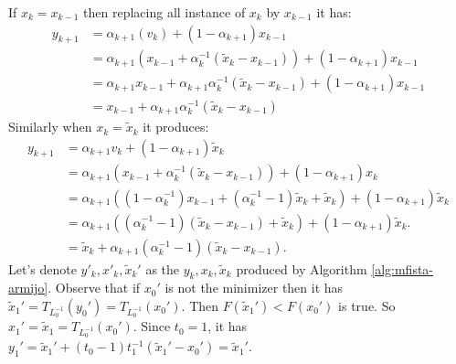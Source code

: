 \documentclass[12pt]{report}
\begin{document}
\begin{example}
            If $x_k = x_{k - 1}$ then replacing all instance of $x_k$ by $x_{k - 1}$ it has: 
            \begin{align*}
                y_{k + 1} &= \alpha_{k + 1}(v_k) + (1 - \alpha_{k + 1})x_{k - 1}
                \\
                &= \alpha_{k + 1}(x_{k - 1} + \alpha_k^{-1}(\tilde x_k - x_{k - 1})) + (1 - \alpha_{k + 1})x_{k - 1}
                \\
                &= \alpha_{k + 1} x_{k - 1} + \alpha_{k + 1}\alpha_k^{-1}(\tilde x_k - x_{k - 1}) + (1 - \alpha_{k + 1}) x_{k - 1}
                \\
                &= x_{k - 1} + \alpha_{k + 1}\alpha_k^{-1}(\tilde x_k - x_{k - 1})
            \end{align*}
            Similarly when $x_k = \tilde x_k$ it produces: 
            \begin{align*}
                y_{k + 1} &= 
                \alpha_{k + 1}v_k + (1 - \alpha_{k + 1})\tilde x_k
                \\
                &= 
                \alpha_{k + 1}(x_{k - 1} + \alpha_k^{-1}(\tilde x_k - x_{k - 1})) + (1 - \alpha_{k + 1})x_k
                \\
                &= 
                \alpha_{k + 1}\left(
                    (1 - \alpha_{k}^{-1})x_{k - 1} + (\alpha_k^{-1} - 1)\tilde x_k + \tilde x_k
                \right) + 
                (1 - \alpha_{k + 1})\tilde x_k
                \\
                &= 
                \alpha_{k + 1}\left(
                    (\alpha_k^{-1} - 1)(\tilde x_k - x_{k - 1}) + \tilde x_k
                \right) + 
                (1 - \alpha_{k + 1})\tilde x_k. 
                \\
                &= \tilde x_k + \alpha_{k + 1}(\alpha_k^{-1} - 1)(\tilde x_k - x_{k - 1}). 
            \end{align*}
            Let's denote $y'_{k}, x'_{k}, \tilde x_k'$ as the $y_k, x_k, \tilde x_k$ produced by Algorithm \ref{alg:mfista-armijo}.
            Observe that if $x_0'$ is not the minimizer then it has $\tilde x_1' = T_{L_0^{-1}}(y_0') = T_{L_0^{-1}}(x_0')$. 
            Then $F(\tilde x_1') < F(x_0')$ is true. 
            So $x_1' = \tilde x_1 = T_{L_0^{-1}}(x_0')$. 
            Since $t_0 = 1$, it has $y_1' =\tilde x_1' + (t_0 - 1)t_1^{-1}(\tilde x_1' - x_0')= \tilde x_1'$. 

\end{example}
\end{document}
